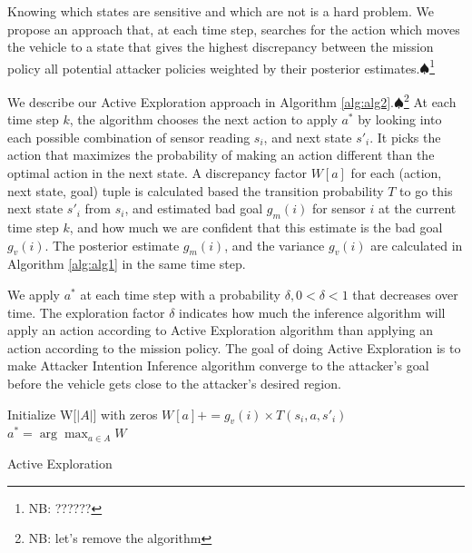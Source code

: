 \documentclass[letterpaper, 10 pt, conference]{ieeeconf}  %
\newcommand\NB[1]{$\spadesuit$\footnote{NB: #1}}
\begin{document}
Knowing which states are sensitive and which are not is a hard problem. We propose an approach that, at each time step, searches for the action which moves the vehicle to a state that gives the highest discrepancy between the mission policy all potential attacker policies weighted by their posterior estimates.\NB{??????}

We describe our Active Exploration approach in Algorithm \ref{alg:alg2}.\NB{let's remove the algorithm} At each time step $k$, the algorithm chooses the next action to apply $a^*$ by looking into each possible combination of sensor reading $s_i$, and next state $s'_i$. It picks the action that maximizes the probability of making an action different than the optimal action in the next state. A discrepancy factor  $W[a]$ for each (action, next state, goal) tuple is calculated based the transition probability $T$ to go this next state $s'_i$ from $s_i$, and estimated bad goal $g_m(i)$ for sensor $i$ at the current time step $k$, and how much we are confident that this estimate is the bad goal $g_v(i)$. The posterior estimate $g_m(i)$, and the variance $g_v(i)$ are calculated in Algorithm \ref{alg:alg1} in the same time step.

We apply $a^*$ at each time step with a probability $\delta, 0 < \delta < 1$ that decreases over time. The exploration factor $\delta$ indicates how much the inference algorithm will apply an action according to Active Exploration algorithm than applying an action according to the mission policy. The goal of doing Active Exploration is to make Attacker Intention Inference algorithm converge to the attacker's goal before the vehicle gets close to the attacker's desired region.
\begin{algorithm}\label{alg:alg2}
    Initialize W[$|A|$] with zeros\;
    {
        {
            {
                {                     $W[a]+= g_v(i) \times T(s_i, a, s'_i)$\;
                }
            }
        }
    }
    $a^*=\arg\!\max_{a\in A}W$\;
    \caption{Active Exploration}
\end{algorithm}
\end{document}
